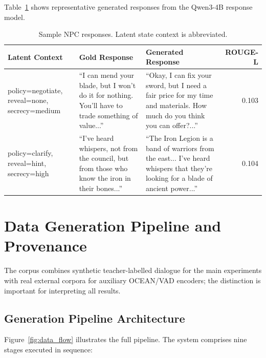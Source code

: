 \documentclass[11pt]{article}
\begin{document}
Table~\ref{tab:samples} shows representative generated responses from the Qwen3-4B response model.

\begin{table}[tp]
\centering
\caption{Sample NPC responses. Latent state context is abbreviated.}
\label{tab:samples}
\footnotesize\setlength{\tabcolsep}{2pt}
\begin{tabular}{@{}p{3.8cm}p{5.2cm}p{5.2cm}r@{}}
\toprule
\textbf{Latent Context} & \textbf{Gold Response} & \textbf{Generated Response} & \textbf{ROUGE-L} \\
\midrule
policy=negotiate, reveal=none, secrecy=medium &
``I can mend your blade, but I won't do it for nothing. You'll have to trade something of value...'' &
``Okay, I can fix your sword, but I need a fair price for my time and materials. How much do you think you can offer?...'' &
0.103 \\
\midrule
policy=clarify, reveal=hint, secrecy=high &
``I've heard whispers, not from the council, but from those who know the iron in their bones...'' &
``The Iron Legion is a band of warriors from the east... I've heard whispers that they're looking for a blade of ancient power...'' &
0.104 \\
\bottomrule
\end{tabular}
\end{table}

\section{Data Generation Pipeline and Provenance}
\label{app:datagen}

The corpus combines synthetic teacher-labelled dialogue for the main experiments with real external corpora for auxiliary OCEAN/VAD encoders; the distinction is important for interpreting all results.

\subsection{Generation Pipeline Architecture}

Figure~\ref{fig:data_flow} illustrates the full pipeline.
The system comprises nine stages executed in sequence:
\end{document}
